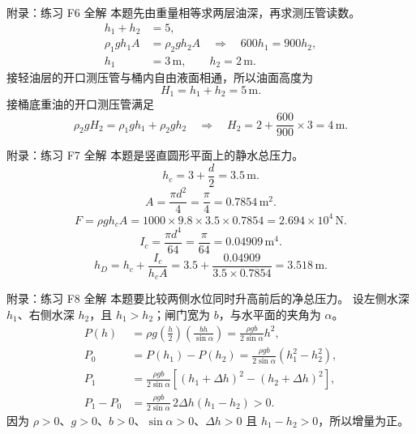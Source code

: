 \documentclass[aspectratio=169,10pt]{beamer}
\begin{document}
\begin{frame}{附录：练习 F6 全解}
  \small
  本题先由重量相等求两层油深，再求测压管读数。
  \begin{align}
    h_1+h_2&=5, \tag{A22}\\
    \rho_1gh_1A&=\rho_2gh_2A
      \quad\Longrightarrow\quad 600h_1=900h_2, \tag{A23}\\
    h_1&=3\,\mathrm{m},\qquad h_2=2\,\mathrm{m}. \tag{A24}
  \end{align}
  接轻油层的开口测压管与桶内自由液面相通，所以油面高度为
  \[
    H_1=h_1+h_2=5\,\mathrm{m}. \tag{A25}
  \]
  接桶底重油的开口测压管满足
  \[
    \rho_2gH_2=\rho_1gh_1+\rho_2gh_2
    \quad\Longrightarrow\quad
    H_2=2+\frac{600}{900}\times3=4\,\mathrm{m}. \tag{A26}
  \]
\end{frame}

\begin{frame}{附录：练习 F7 全解}
  本题是竖直圆形平面上的静水总压力。
  \[
    h_c=3+\frac{d}{2}=3.5\,\mathrm{m}. \tag{A27}
  \]
  \[
    A=\frac{\pi d^2}{4}
     =\frac{\pi}{4}
     =0.7854\,\mathrm{m^2}. \tag{A28}
  \]
  \[
    F=\rho gh_cA
     =1000\times9.8\times3.5\times0.7854
     =2.694\times10^4\,\mathrm{N}. \tag{A29}
  \]
  \[
    I_c=\frac{\pi d^4}{64}=\frac{\pi}{64}=0.04909\,\mathrm{m^4}. \tag{A30}
  \]
  \[
    h_D=h_c+\frac{I_c}{h_cA}
       =3.5+\frac{0.04909}{3.5\times0.7854}
       =3.518\,\mathrm{m}. \tag{A31}
  \]
\end{frame}

\begin{frame}{附录：练习 F8 全解}
  \small
  本题要比较两侧水位同时升高前后的净总压力。
  设左侧水深 $h_1$、右侧水深 $h_2$，且 $h_1>h_2$；闸门宽为 $b$，与水平面的夹角为 $\alpha$。
  \begin{align}
    P(h)&=\rho g\left(\frac{h}{2}\right)
          \left(\frac{bh}{\sin\alpha}\right)
        =\frac{\rho gb}{2\sin\alpha}h^2, \tag{A32}\\
    P_0&=P(h_1)-P(h_2)
       =\frac{\rho gb}{2\sin\alpha}(h_1^2-h_2^2), \tag{A33}\\
    P_1&=\frac{\rho gb}{2\sin\alpha}
        \left[(h_1+\Delta h)^2-(h_2+\Delta h)^2\right], \tag{A34}\\
    P_1-P_0
      &=\frac{\rho gb}{2\sin\alpha}\,2\Delta h(h_1-h_2)>0. \tag{A35}
  \end{align}
  因为 $\rho>0$、$g>0$、$b>0$、$\sin\alpha>0$、$\Delta h>0$ 且 $h_1-h_2>0$，所以增量为正。
\end{frame}
\end{document}
